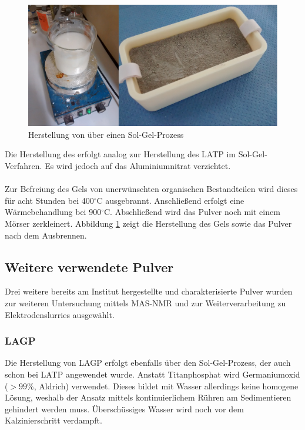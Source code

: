 \documentclass[a4paper, 11pt, headsepline,footsepline,twoside,abstract]{scrbook}
\begin{document}
\subsection{}
\begin{figure}
	\centering
	\includegraphics[width=1.0\columnwidth]{images/SolGel.jpg}
	\caption{Herstellung von  über einen Sol-Gel-Prozess}
	\label{sol_gel}
\end{figure}
Die Herstellung des  erfolgt analog zur Herstellung des LATP im Sol-Gel-Verfahren. Es wird jedoch auf das Aluminiumnitrat verzichtet.
\\\\
Zur Befreiung des Gels von unerwünschten organischen Bestandteilen wird dieses für acht Stunden bei 400$^\circ$C ausgebrannt. Anschließend erfolgt eine Wärmebehandlung bei 900$^\circ$C. Abschließend wird das Pulver noch mit einem Mörser zerkleinert. Abbildung \ref{sol_gel} zeigt die Herstellung des Gels sowie das Pulver nach dem Ausbrennen.
\subsection{Weitere verwendete Pulver}
\label{methodik_weitere_Pulver}
Drei weitere bereits am Institut hergestellte und charakterisierte Pulver wurden zur weiteren Untersuchung mittels MAS-NMR und zur Weiterverarbeitung zu Elektrodenslurries ausgewählt.  
\subsubsection{LAGP}
Die Herstellung von LAGP erfolgt ebenfalls über den Sol-Gel-Prozess, der auch schon bei LATP angewendet wurde. Anstatt Titanphosphat wird Germaniumoxid ($>99\%$, Aldrich) verwendet. Dieses bildet mit Wasser allerdings keine homogene Lösung, weshalb der Ansatz mittels kontinuierlichem Rühren am Sedimentieren gehindert werden muss. Überschüssiges Wasser wird noch vor dem Kalzinierschritt verdampft.
\end{document}
